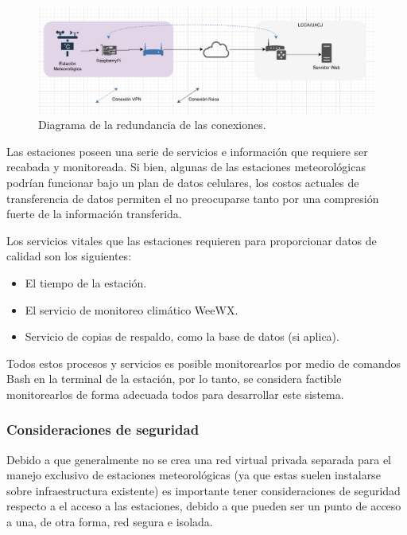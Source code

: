 \begin{figure}[!ht]
	\centering
	\includegraphics[width=.75\linewidth]{images/diagrams/conexion.png}
	\caption{Diagrama de la redundancia de las conexiones.}
	\label{fig:conexion_redundancia}
\end{figure}

Las estaciones poseen una serie de servicios e información que requiere ser recabada y monitoreada. Si bien, algunas de las estaciones meteorológicas podrían funcionar bajo un plan de datos celulares, los costos actuales de transferencia de datos permiten el no preocuparse tanto por una compresión fuerte de la información transferida.

Los servicios vitales que las estaciones requieren para proporcionar datos de calidad son los siguientes:

\begin{itemize}
   \item El tiempo de la estación.
   \item El servicio de monitoreo climático WeeWX.
   \item Servicio de copias de respaldo, como la base de datos (si aplica).
\end{itemize}

Todos estos procesos y servicios es posible monitorearlos por medio de comandos Bash en la terminal de la estación, por lo tanto, se considera factible monitorearlos de forma adecuada todos para desarrollar este sistema.

\subsubsection{Consideraciones de seguridad}

Debido a que generalmente no se crea una red virtual privada separada para el manejo exclusivo de estaciones meteorológicas (ya que estas suelen instalarse sobre infraestructura existente) es importante tener consideraciones de seguridad respecto a el acceso a las estaciones, debido a que pueden ser un punto de acceso a una, de otra forma, red segura e isolada.

